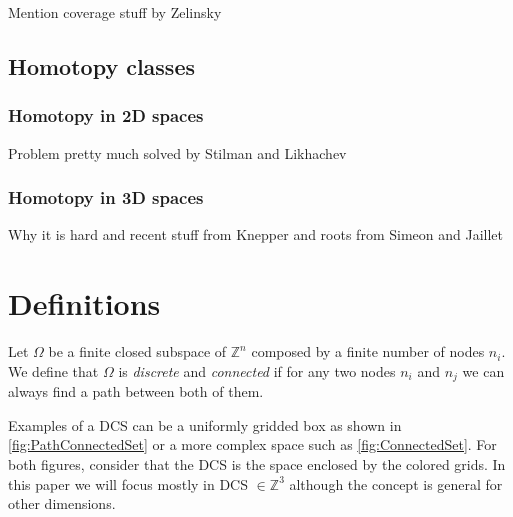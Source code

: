 \documentclass[graybox]{svmult}
\newcommand{\Z}{\mathbb{Z} }
\begin{document}
Mention coverage stuff by Zelinsky \cite{Zelinsky1993Coverage}

\subsection{Homotopy classes}

\label{subsec:HomotopyClasses}

\subsubsection{Homotopy in 2D spaces}
Problem pretty much solved by Stilman \cite{Igarashi2010Homotopy2D} and Likhachev \cite{Bhattacharya2010Homotopy2D}

\subsubsection{Homotopy in 3D spaces}
Why it is hard and recent stuff from Knepper \cite{Knepper2012Equivalence} and roots from Simeon \cite{Simeon2000VisibilityPRM} and Jaillet \cite{Jaillet2008PathDeformation}

\section{Definitions}
\label{sec:Definitions}


\begin{definition}
Let $\Omega$ be a finite closed subspace of $\Z^{n}$ composed by a finite number of nodes $n_{i}$. We define that $\Omega$ is \emph{discrete} and \emph{connected} if for any two nodes $n_{i}$ and $n_{j}$ we can always find a path between both of them.     
\end{definition}

Examples of a DCS can be a uniformly gridded box as shown in \ref{fig:PathConnectedSet} or a more complex space such as \ref{fig:ConnectedSet}. For both figures, consider that the DCS is the space enclosed by the colored grids. In this paper we will focus mostly in DCS $\in \Z^{3}$ although the concept is general for other dimensions.
\end{document}
